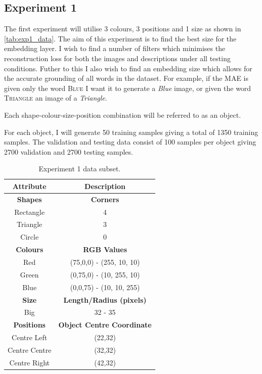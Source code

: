 \subsection{Experiment 1}
The first experiment will utilise 3 colours, 3 positions and 1 size as shown in \autoref{tab:exp1_data}. The aim of this experiment is to find the best size for the embedding layer. I wish to find a number of filters which minimises the reconstruction loss for both the images and descriptions under all testing conditions. Futher to this I also wish to find an embedding size which allows for the accurate grounding of all words in the dataset. For example, if the MAE is given only the word \textsc{Blue} I want it to generate a \textit{Blue} image, or given the word \textsc{Triangle} an image of a \textit{Triangle}. 

Each shape-colour-size-position combination will be referred to as an object.

For each object, I will generate 50 training samples giving a total of 1350 training samples. The validation and testing data consist of 100 samples per object giving 2700 validation and 2700 testing samples.



\begin{table}[ht]
\centering
\begin{tabular}{|c|c|}
\hline
\textbf{Attribute} & \textbf{Description} \\ \hline \hline
\textbf{Shapes} & \textbf{Corners} \\ \hline
Rectangle & 4\\ \hline
Triangle & 3\\ \hline
Circle & 0\\ \hline 

\textbf{Colours} & \textbf{RGB Values}	\\ \hline	
Red & (75,0,0) - (255, 10, 10)\\ \hline
Green  & (0,75,0) - (10, 255, 10)\\ \hline
Blue   & (0,0,75) - (10, 10, 255)\\ \hline


\textbf{Size} & 	\textbf{Length/Radius (pixels)} \\ \hline			  
Big    & 32 - 35  \\ \hline


\textbf{Positions} & \textbf{Object Centre Coordinate}	\\ \hline				  
Centre Left &(22,32)\\ \hline
Centre Centre & (32,32)\\ \hline
Centre Right &(42,32)\\ \hline
				
\end{tabular}
\caption{Experiment 1 data subset.}
\label{tab:exp1_data} 
\end{table}

